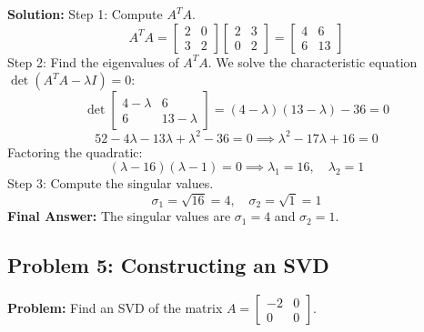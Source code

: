 \documentclass[11pt, letterpaper]{article}
\theoremstyle{definition}
\theoremstyle{remark}
\begin{document}
\textbf{Solution:}
Step 1: Compute $A^TA$.
\[
A^TA = \begin{bmatrix} 2 & 0 \\ 3 & 2 \end{bmatrix} \begin{bmatrix} 2 & 3 \\ 0 & 2 \end{bmatrix} = \begin{bmatrix} 4 & 6 \\ 6 & 13 \end{bmatrix}
\]
Step 2: Find the eigenvalues of $A^TA$.
We solve the characteristic equation $\det(A^TA - \lambda I) = 0$:
\[
\det \begin{bmatrix} 4 - \lambda & 6 \\ 6 & 13 - \lambda \end{bmatrix} = (4 - \lambda)(13 - \lambda) - 36 = 0
\]
\[
52 - 4\lambda - 13\lambda + \lambda^2 - 36 = 0 \implies \lambda^2 - 17\lambda + 16 = 0
\]
Factoring the quadratic:
\[
(\lambda - 16)(\lambda - 1) = 0 \implies \lambda_1 = 16, \quad \lambda_2 = 1
\]
Step 3: Compute the singular values.
\[
\sigma_1 = \sqrt{16} = 4, \quad \sigma_2 = \sqrt{1} = 1
\]
\textbf{Final Answer:} The singular values are $\sigma_1 = 4$ and $\sigma_2 = 1$.

\vspace{1em}
\subsection{Problem 5: Constructing an SVD}
\textbf{Problem:} Find an SVD of the matrix $A = \begin{bmatrix} -2 & 0 \\ 0 & 0 \end{bmatrix}$.
\end{document}
